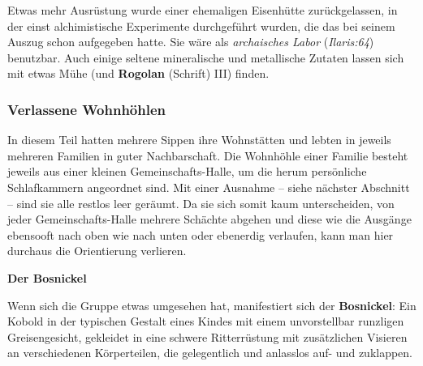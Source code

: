 Etwas mehr Ausrüstung wurde einer ehemaligen Eisenhütte zurückgelassen, in der einst alchimistische Experimente durchgeführt wurden, die das \fkv bei seinem Auszug schon aufgegeben hatte.
Sie wäre als \emph{archaisches Labor} (\emph{Ilaris:64}) benutzbar.
Auch einige seltene mineralische und metallische Zutaten lassen sich mit etwas Mühe (und \textbf{Rogolan} (Schrift) III) finden.

\subsubsection{Verlassene Wohnhöhlen}
In diesem Teil hatten mehrere Sippen ihre Wohnstätten und lebten in jeweils mehreren Familien in guter Nachbarschaft.
Die Wohnhöhle einer Familie besteht jeweils aus einer kleinen Gemeinschafts-Halle, um die herum persönliche Schlafkammern angeordnet sind.
Mit einer Ausnahme -- siehe nächster Abschnitt -- sind sie alle restlos leer geräumt.
Da sie sich somit kaum unterscheiden, von jeder Gemeinschafts-Halle mehrere Schächte abgehen und diese wie die Ausgänge ebensooft nach oben wie nach unten oder ebenerdig verlaufen, kann man hier durchaus die Orientierung verlieren.

\neuespalte

\textbf{Der Bosnickel}


Wenn sich die Gruppe etwas umgesehen hat, manifestiert sich der \textbf{Bosnickel}:
Ein Kobold in der typischen Gestalt eines Kindes mit einem unvorstellbar runzligen Greisengesicht,
gekleidet in eine schwere Ritterrüstung mit zusätzlichen Visieren an verschiedenen Körperteilen,
die gelegentlich und anlasslos auf- und zuklappen.



